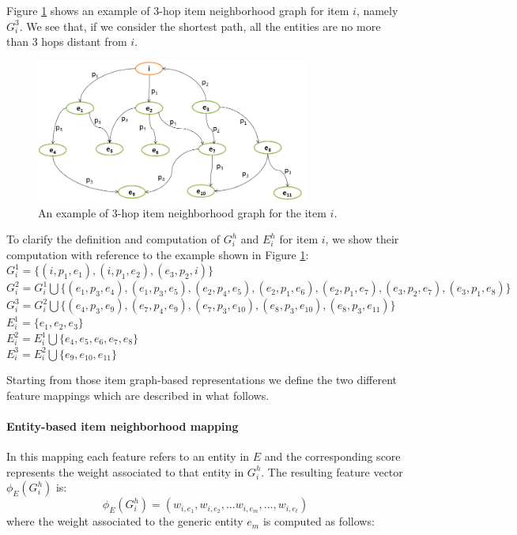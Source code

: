 Figure \ref{fig:graph-rec:Example} shows an example of 3-hop item neighborhood graph for item $i$, namely $G^3_i$. We see that, if we consider the shortest path, all the entities are no more than 3 hops distant from $i$. 
\begin{figure}
\begin{center}
\includegraphics[width=0.8\textwidth]{ch07_graph-rec_pics/item_neig.png}
\end{center}
\caption{An example of 3-hop item neighborhood graph for the item $i$.}
\label{fig:graph-rec:Example}
\end{figure}
To clarify the definition and computation of $G^h_i$ and $E^h_i$ for item $i$, we show their computation with reference to the example shown in Figure \ref{fig:graph-rec:Example}:\\ 
$G^1_i= \lbrace (i,p_1,e_1), (i,p_1,e_2), (e_3,p_2,i)\rbrace$\\ 
$G^2_i= G^1_i \bigcup \lbrace (e_1,p_3,e_4), (e_1,p_3,e_5), (e_2,p_4,e_5), (e_2,p_1,e_6),(e_2,p_1,e_7), (e_3,p_2,e_7), (e_3,p_1,e_8) \rbrace$\\
$G^3_i= G^2_i \bigcup \lbrace (e_4,p_3,e_9), (e_7,p_4,e_9), (e_7,p_3,e_{10}), (e_8,p_3,e_{10}),(e_8,p_3,e_{11}) \rbrace$\\
$E^1_i= \lbrace e_1, e_2, e_3 \rbrace$\\
$E^2_i=  E^1_i \bigcup  \lbrace e_4, e_5, e_6, e_7, e_8 \rbrace$\\
$E^3_i=  E^2_i \bigcup  \lbrace e_9, e_{10}, e_{11} \rbrace$

Starting from those item graph-based representations we define the two different feature mappings which are described in what follows.
\paragraph*{\textbf{Entity-based item neighborhood mapping}}
In this mapping each feature refers to an entity in $E$ and the corresponding score represents the weight associated to that entity in $G^h_i$. The resulting feature vector $\phi_E(G^h_i)$ is:
\[
\phi_E(G^h_i)=(w_{i,e_1} ,w_{i,e_2} ,...w_{i,e_m} ,...,w_{i,e_t} )
\]
where the weight associated to the generic entity $e_m$ is computed as follows:

